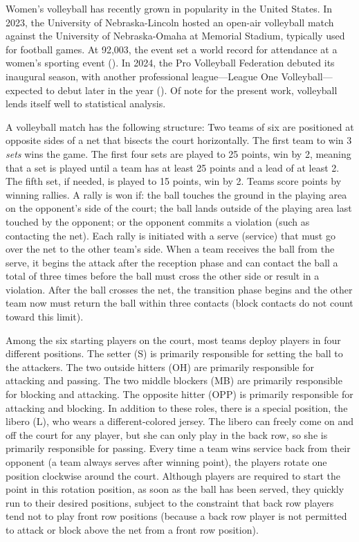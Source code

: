 \documentclass[USenglish]{article}
\theoremstyle{dgthm}
\theoremstyle{dgdef}
\begin{document}
Women's volleyball has recently grown in popularity in the United States. In 2023, the University of Nebraska-Lincoln hosted an open-air volleyball match against the University of Nebraska-Omaha at Memorial Stadium, typically used for football games. At 92,003, the event set a world record for attendance at a women's sporting event (\cite{olson_2023}). In 2024, the Pro Volleyball Federation debuted its inaugural season, with another professional league---League One Volleyball---expected to debut later in the year (\cite{echlin_2024}). Of note for the present work, volleyball lends itself well to statistical analysis.

A volleyball match has the following structure: Two teams of six are positioned at opposite sides of a net that bisects the court horizontally. The first team to win 3 {\it sets} wins the game. The first four sets are played to 25 points, win by 2, meaning that a set is played until a team has at least 25 points and a lead of at least 2. The fifth set, if needed, is played to 15 points, win by 2. Teams score points by winning rallies. A rally is won if: the ball touches the ground in the playing area on the opponent's side of the court; the ball lands outside of the playing area last touched by the opponent; or the opponent commits a violation (such as contacting the net). Each rally is initiated with a serve (service) that must go over the net to the other team's side. When a team receives the ball from the serve, it begins the attack  after  the  reception phase and can contact the ball a total of three times before the ball must cross the other side or result in a violation. After the ball crosses the net, the transition phase begins and the other team now must return the ball within three contacts (block contacts do not count toward this limit).

Among the six starting players on the court, most teams deploy players in four different positions. The setter (S) is primarily responsible for setting the ball to the attackers. The two outside hitters (OH) are primarily responsible for attacking and passing. The two middle blockers (MB) are primarily responsible for blocking and attacking. The opposite hitter (OPP) is primarily responsible for attacking and blocking. In addition to these roles, there is a special position, the libero (L), who wears a different-colored jersey. The libero can freely come on and off the court for any player, but she can only play in the back row, so she is primarily responsible for passing. Every time a team wins service back from their opponent (a team always serves after winning point), the players rotate one position clockwise around the court. Although players are required to start the point in this rotation position, as soon as the ball has been served, they quickly run to their desired positions, subject to the constraint that back row players tend not to play front row positions (because a back row player is not permitted to attack or block above the net from a front row position).
\end{document}
